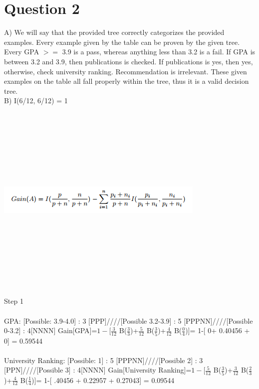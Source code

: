 \documentclass{article}
\begin{document}
\section{Question 2}
A) We will say that the provided tree correctly categorizes the provided examples. Every example given by the table can be proven by the given tree. Every GPA $>=$ 3.9 is a pass, whereas anything less than 3.2 is a fail. If GPA is between 3.2 and 3.9, then publications is checked. If publications is yes, then yes, otherwise, check university ranking. Recommendation is irrelevant. These given examples on the table all fall properly within the tree, thus it is a valid decision tree.
\\
B) I(6/12, 6/12) = 1
\\
\includegraphics[width=10cm,height=10cm,keepaspectratio]{"gain"}
\\
{\LARGE Step 1}
\\
\\
{\large GPA:} [Possible: 3.9-4.0] : 3 [PPP]////[Possible 3.2-3.9] : 5 [PPPNN]////[Possible 0-3.2] : 4[NNNN]
Gain[GPA]=$1-$[$\frac{3}{12}$ B($\frac{3}{3}$)+$\frac{5}{12}$ B($\frac{3}{5}$)+$\frac{4}{12}$ B($\frac{0}{4}$)]= 1-[ 0+ 0.40456 + 0] = 0.59544
\\
\\
{\large University Ranking:} [Possible: 1] : 5 [PPPNN]////[Possible 2] : 3 [PPN]////[Possible 3] : 4[NNNN]
Gain[University Ranking]=$1-$[$\frac{5}{12}$ B($\frac{3}{5}$)+$\frac{3}{12}$ B($\frac{2}{3}$)+$\frac{4}{12}$ B($\frac{1}{4}$)]= 1-[ .40456 + 0.22957 + 0.27043] = 0.09544
\\
\\
\end{document}
